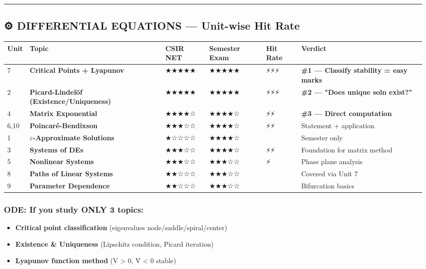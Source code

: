 \documentclass[12pt,a4paper,openany]{book}
\begin{document}
{\bigskip\noindent\rule{\textwidth}{0.4pt}\bigskip

\subsection{⚙️ DIFFERENTIAL EQUATIONS — Unit-wise Hit Rate}

\begin{center}
\begin{tabular}{|l|l|l|l|l|l|}
\hline
\textbf{Unit} & \textbf{Topic} & \textbf{CSIR NET} & \textbf{Semester Exam} & \textbf{Hit Rate} & \textbf{Verdict} \\
\hline
7 & \textbf{Critical Points + Lyapunov} & ★★★★★ & ★★★★★ & ⚡⚡⚡ & \textbf{\#1 — Classify stability = easy marks} \\
\hline
2 & \textbf{Picard-Lindelöf (Existence/Uniqueness)} & ★★★★★ & ★★★★★ & ⚡⚡⚡ & \textbf{\#2 — "Does unique soln exist?"} \\
\hline
4 & \textbf{Matrix Exponential} & ★★★★☆ & ★★★★☆ & ⚡⚡ & \textbf{\#3 — Direct computation} \\
\hline
6,10 & \textbf{Poincaré-Bendixson} & ★★★☆☆ & ★★★★☆ & ⚡⚡ & Statement + application \\
\hline
1 & \textbf{$\varepsilon$-Approximate Solutions} & ★☆☆☆☆ & ★★★★☆ &  & Semester only \\
\hline
3 & \textbf{Systems of DEs} & ★★★☆☆ & ★★★★☆ & ⚡⚡ & Foundation for matrix method \\
\hline
5 & \textbf{Nonlinear Systems} & ★★★☆☆ & ★★★☆☆ & ⚡ & Phase plane analysis \\
\hline
8 & \textbf{Paths of Linear Systems} & ★★☆☆☆ & ★★★☆☆ &  & Covered via Unit 7 \\
\hline
9 & \textbf{Parameter Dependence} & ★★☆☆☆ & ★★★☆☆ &  & Bifurcation basics \\
\hline
\end{tabular}
\end{center}

\subsubsection{ ODE: If you study ONLY 3 topics:}
\begin{itemize}
  \item \textbf{Critical point classification} (eigenvalues  node/saddle/spiral/center)
  \item \textbf{Existence & Uniqueness} (Lipschitz condition, Picard iteration)
  \item \textbf{Lyapunov function method} (V > 0, V̇ < 0  stable)
\end{itemize}

}
\end{document}
